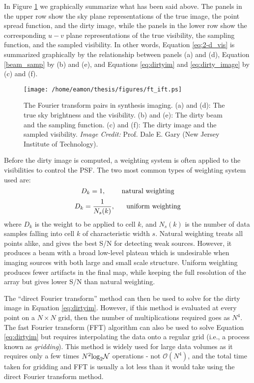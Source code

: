In Figure \ref{fig2.10} we graphically summarize what has been said above. The panels in the upper row show the sky plane representations of the true image, the point spread function, and the dirty image, while the panels in the lower row show the corresponding $u-v$ plane representations of the true visibility, the sampling function, and the sampled visibility. In other words, Equation \ref{eq:2-d_vis} is summarized graphically by the relationship between panels (a) and (d),  Equation \ref{beam_samp} by (b) and (e), and Equations \ref{eq:dirtyim} and \ref{eq:dirty_image} by (c) and (f).

\begin{figure}[t!]
\centering 
          \texttt{[image: /home/eamon/thesis/figures/ft\_ift.ps]}
\caption[The Fourier transform pairs in synthesis imaging]{The Fourier transform pairs in synthesis imaging. (a) and (d): The true sky brightness and the visibility. (b) and (e): The dirty beam and the sampling function. (c) and (f): The dirty image and the sampled visibility. \textit{Image Credit:} Prof. Dale E. Gary (New Jersey Institute of Technology).}
\label{fig2.10}
\end{figure}

Before the dirty image is computed, a weighting system is often applied to the visibilities to control the PSF. The two most common types of weighting system used are:
\begin{equation}
D_{k}=1,	\ \ \ \ \ \ \ \rm{natural \ weighting}
\end{equation}
\begin{equation}
D_{k}=\frac{1}{N_{s}(k)}, \ \ \ \ \ \rm{uniform \ weighting}
\end{equation}
where $D_{k}$ is the weight to be applied to cell $k$, and ${N_{s}(k)}$ is the number of data samples falling into cell $k$ of characteristic width $s$. Natural weighting treats all points alike, and gives the best S/N for detecting weak sources. However, it produces a beam with a broad low-level plateau which is undesirable when imaging sources with both large and small scale structure. Uniform weighting produces fewer artifacts in the final map, while keeping the full resolution of the array but gives lower S/N than natural weighting.

The ``direct Fourier transform'' method can then be used to solve for the dirty image in Equation \ref{eq:dirtyim}. However, if this method is evaluated at every point on a $N\times N$ grid, then the number of multiplications required goes as $N^{4}$. The fast Fourier transform (FFT) algorithm can also be used to solve Equation \ref{eq:dirtyim} but requires interpolating the data onto a regular grid (i.e., a process known as \textit{gridding}). This method is widely used for large data volumes as it requires only a few times $N^{2}\rm{log}_{2}\mathcal{N}$ operations - not $\mathcal{O}(N^4)$, and the total time taken for gridding and FFT is usually a lot less than it would take using the direct Fourier transform method.

